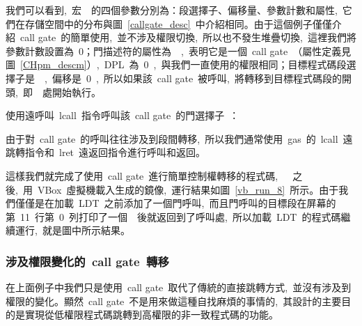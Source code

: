 \label{CHpm_cg_test}

我們可以看到,~宏~~的四個參數分別為：段選擇子、偏移量、參數計數和屬性,~它們在存儲空間中的分布與圖~\ref{callgate_desc}~中介紹相同。由于這個例子僅僅介紹~call gate~的簡單使用,~並不涉及權限切換,~所以也不發生堆疊切換,~這裡我們將參數計數設置為~0；門描述符的屬性為~~,~表明它是一個~call gate~（屬性定義見圖~\ref{CHpm_descm}）,~DPL~為~0~,~與我們一直使用的權限相同；目標程式碼段選擇子是~~,~偏移是~0~,~所以如果該~call gate~被呼叫,~將轉移到目標程式碼段的開頭,~即~~處開始執行。

使用遠呼叫~lcall~指令呼叫該~call gate~的門選擇子~：

\label{CHpm_cg_call1}

由于對~call gate~的呼叫往往涉及到段間轉移,~所以我們通常使用~gas~的~lcall~遠跳轉指令和~lret~遠返回指令進行呼叫和返回。

這樣我們就完成了使用~call gate~進行簡單控制權轉移的程式碼,~~~之後,~用~VBox~虛擬機載入生成的鏡像,~運行結果如圖~\ref{vb_run_8}~所示。由于我們僅僅是在加載~LDT~之前添加了一個門呼叫,~而且門呼叫的目標段在屏幕的第~11~行第~0~列打印了一個~~後就返回到了呼叫處,~所以加載~LDT~的程式碼繼續運行,~就是圖中所示結果。


\subsubsection{涉及權限變化的~call gate~轉移}

在上面例子中我們只是使用~call gate~取代了傳統的直接跳轉方式,~並沒有涉及到權限的變化。顯然~call gate~不是用來做這種自找麻煩的事情的,~其設計的主要目的是實現從低權限程式碼跳轉到高權限的非一致程式碼的功能。

